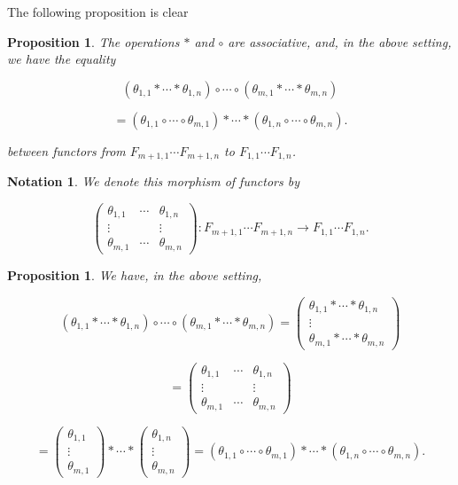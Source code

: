 \documentclass[12pt]{article}%
\newtheorem{prop}[thm]{Proposition}
\newtheorem{nota}[thm]{Notation}
\theoremstyle{remark}
\theoremstyle{definition}
\newcommand{\nn}{\noindent}
\begin{document}
The following proposition is clear 

\begin{prop}
The operations $*$ and $\circ$ are associative, and, in the above setting, we have the equality 

$$
(\theta_{1,1}*\cdots*\theta_{1,n})\circ\cdots\circ(\theta_{m,1}*\cdots*\theta_{m,n})
$$ 

$$
=(\theta_{1,1}\circ\cdots\circ\theta_{m,1})*\cdots*(\theta_{1,n}\circ\cdots\circ\theta_{m,n}).
$$

\nn between functors from $F_{m+1,1}\cdots F_{m+1,n}$ to $F_{1,1}\cdots F_{1,n}$.
\end{prop}

\begin{nota}\label{nmat}%
We denote this morphism of functors by

$$
\begin{pmatrix}
\theta_{1,1}&\cdots&\theta_{1,n}\\
\vdots&&\vdots\\ 
\theta_{m,1}&\cdots&\theta_{m,n}
\end{pmatrix}:F_{m+1,1}\cdots F_{m+1,n}\to F_{1,1}\cdots F_{1,n}.
$$ 
\end{nota}

\begin{prop}\label{pil1}
We have, in the above setting,

$$
(\theta_{1,1}*\cdots*\theta_{1,n})\circ\cdots\circ(\theta_{m,1}*\cdots*\theta_{m,n})
=\begin{pmatrix}
\theta_{1,1}*\cdots*\theta_{1,n}\\
\vdots\\ 
\theta_{m,1}*\cdots*\theta_{m,n}
\end{pmatrix}
$$ 

$$
=\begin{pmatrix}
\theta_{1,1}&\cdots&\theta_{1,n}\\
\vdots&&\vdots\\ 
\theta_{m,1}&\cdots&\theta_{m,n}
\end{pmatrix}
$$

$$
=\begin{pmatrix}\theta_{1,1}\\ \vdots\\ \theta_{m,1}\end{pmatrix}*\cdots*
\begin{pmatrix}\theta_{1,n}\\ \vdots\\ \theta_{m,n}\end{pmatrix}
=(\theta_{1,1}\circ\cdots\circ\theta_{m,1})*\cdots*(\theta_{1,n}\circ\cdots\circ\theta_{m,n}).
$$
\end{prop}
\end{document}
